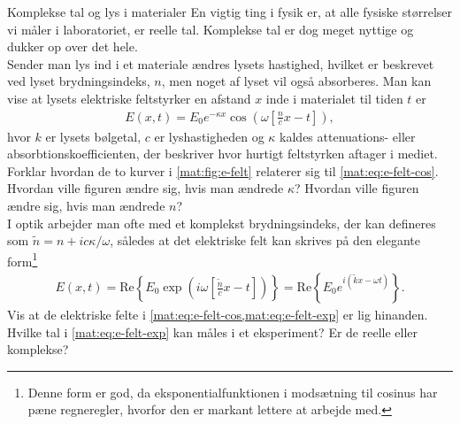 \begin{opgave}[3]{Komplekse tal og lys i materialer}
En vigtig ting i fysik er, at alle fysiske størrelser vi måler i laboratoriet, er reelle  tal. Komplekse tal er dog meget nyttige og dukker op over det hele. \\
Sender man lys ind i et materiale ændres lysets hastighed, hvilket er beskrevet ved lyset brydningsindeks, $n$, men noget af lyset vil også absorberes. Man kan vise at lysets elektriske feltstyrker en afstand $x$ inde i materialet til tiden $t$ er 
%
\begin{align} \label{mat:eq:e-felt-cos}
    E(x,t) = E_0e^{-\kappa x}\cos\left(\omega\left[\frac{n}{c}x-t\right]\right),
\end{align}
%
hvor $k$ er lysets bølgetal, $c$ er lyshastigheden og $\kappa$ kaldes attenuations- eller absorbtionskoefficienten, der beskriver hvor hurtigt feltstyrken aftager i mediet.
\opg Forklar hvordan de to kurver i \cref{mat:fig:e-felt} relaterer sig til \cref{mat:eq:e-felt-cos}.
\opg Hvordan ville figuren ændre sig, hvis man ændrede $\kappa$?
\opg Hvordan ville figuren ændre sig, hvis man ændrede $n$? \\[2mm]
I optik arbejder man ofte med et komplekst brydningsindeks, der kan defineres som $\tilde{n} = n + ic\kappa/\omega$, således at det elektriske felt kan skrives på den elegante form\footnote{Denne form er god, da eksponentialfunktionen i modsætning til cosinus har pæne regneregler, hvorfor den er markant lettere at arbejde med.}
%
\begin{align} \label{mat:eq:e-felt-exp}
    E(x,t) = \text{Re}\left\{E_0\exp\left(i\omega\left[\frac{\tilde{n}}{c}x - t\right]\right)\right\} = \text{Re}\left\{E_0e^{i\left(\tilde{k}x - \omega t\right)}\right\}.
\end{align}
\opg Vis at de elektriske felte i \cref{mat:eq:e-felt-cos,mat:eq:e-felt-exp} er lig hinanden.
\opg Hvilke tal i \cref{mat:eq:e-felt-exp} kan måles i et eksperiment? Er de reelle eller komplekse?
\end{opgave}